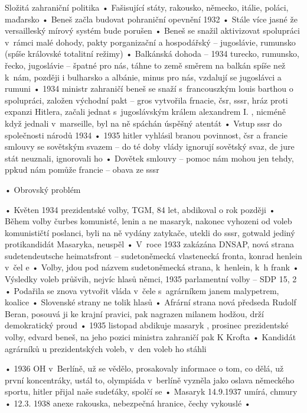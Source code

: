 \documentclass{article}
\begin{document}
Složitá zahraniční politika
    • Fašisující státy, rakousko, německo, itálie, poláci, maďarsko
    • Beneš začla budovat pohraniční opevnění 1932
    • Stále více jasné že versailleský mírový systém bude porušen
    • Beneš se snažil aktivizovat spolupráci v rámci malé dohody, pakty porganizační a hospodářský – jugoslávie, rumunsko (spíše královské totalitní režimy)
    • Balkánská dohoda – 1934 turecko, rumunsko, řecko, jugoslávie – špatné pro nás, táhne to země směrem na balkán spíše než k nám, později i bulharsko a albánie, minus pro nás, vzdalují se jugoslávci a rumuni
    • 1934 ministr zahraničí beneš se snaží s francouszkým louis barthou o spolupráci, založen východní pakt – gros vytvořila frnacie, čsr, sssr, hráz proti expanzi Hitlera, začali jednat s jugoslávským králem alexandrem I. , nicméně když jednali v marseille, byl na ně spáchán úspěšný atentát
    • Vstup sssr do společnosti národů 1934
    • 1935 hitler vyhlásil branou povinnost, čsr a francie smlouvy se sovětským svazem – do té doby vlády ignorují sovětský svaz, de jure stát neuznali, ignorovali ho
    • Dovětek smlouvy – pomoc nám mohou jen tehdy, ppkud nám pomůže francie – obava ze sssr

    • Obrovský problém

    • Květen 1934 prezidentské volby, TGM, 84 let, abdikoval o rok později
    • Během volby čurbes komunisté, lenin a ne masaryk, nakonec vyhozeni od voleb komunističtí poslanci, byli na ně vydány zatykače, utekli do sssr, gotwald jediný protikandidát Masaryka, neuspěl
    • V roce 1933 zakázána DNSAP, nová strana sudetendeutsche heimatsfront – sudetoněmecká vlastenecká fronta, konrad henlein v čel e
    • Volby, jdou pod názvem sudetoněmecká strana, k henlein, k h frank
    • Výsledky voleb průšvih, nejvíc hlasů němci, 1935 parlamentní volby – SDP 15, 2 %
    • Podařila se znova vytvořit vláda v čele s agrárníkem janem malypetrem, koalice
    • Slovenské strany ne tolik hlasů
    • Afrární strana nová předseda Rudolf Beran, posouvá ji ke krajní pravici, pak nagrazen milanem hodžou, drží demokratický proud
    • 1935 listopad abdikuje masaryk , prosinec prezidentské volby, edvard beneš, na jeho pozici ministra zahraničí pak K Krofta
    • Kandidát agrárníků u prezidentských voleb, v den voleb ho stáhli

    • 1936 OH v Berlíně, už se vědělo, prosakovaly informace o tom, co dělá, už první koncentráky, ustál to, olympiáda v berlíně vyzněla jako oslava německého sportu, hitler přijal naše sudeťáky, spolčí se
    • Masaryk 14.9.1937 umírá, chmury
    • 12.3. 1938 anexe rakouska, nebezpečná hranice, čechy vykouslé
    • 
\end{document}
